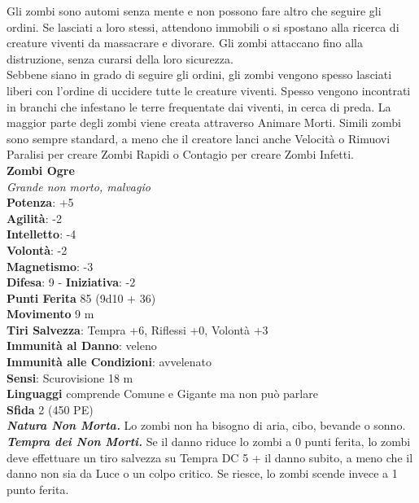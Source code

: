 \begin{multicols}{2}
Gli zombi sono automi senza mente e non possono fare altro che seguire gli ordini. Se lasciati a loro stessi, attendono immobili o si spostano alla ricerca di creature viventi da massacrare e divorare. Gli zombi attaccano fino alla distruzione, senza curarsi della loro sicurezza.\\

Sebbene siano in grado di seguire gli ordini, gli zombi vengono spesso lasciati liberi con l’ordine di uccidere tutte le creature viventi. Spesso vengono incontrati in branchi che infestano le terre frequentate dai viventi, in cerca di preda. La maggior parte degli zombi viene creata attraverso Animare Morti. Simili zombi sono sempre standard, a meno che il creatore lanci anche Velocità o Rimuovi Paralisi per creare Zombi Rapidi o Contagio per creare Zombi Infetti.\\

\medskip\textbf{Zombi Ogre}\\
\emph{Grande non morto, malvagio}\\
\textbf{Potenza}: +5\\
\textbf{Agilità}: -2\\
\textbf{Intelletto}: -4\\
\textbf{Volontà}: -2\\
\textbf{Magnetismo}: -3\\
\textbf{Difesa}: 9 - \textbf{Iniziativa}: -2\\
\textbf{Punti Ferita} 85 (9d10 + 36)\\
\textbf{Movimento} 9 m\\
\textbf{Tiri Salvezza}: Tempra +6, Riflessi +0, Volontà +3\\
\textbf{Immunità al Danno}: veleno\\
\textbf{Immunità alle Condizioni}: avvelenato\\
\textbf{Sensi}: Scurovisione 18 m\\
\textbf{Linguaggi} comprende Comune e Gigante ma non può parlare\\
\textbf{Sfida} 2 (450 PE)\smallskip\\
\emph{\textbf{Natura Non Morta.}} Lo zombi non ha bisogno di aria, cibo, bevande o sonno.\\
\emph{\textbf{Tempra dei Non Morti.}} Se il danno riduce lo zombi a 0 punti ferita, lo zombi deve effettuare un tiro salvezza su Tempra DC 5 + il danno subito, a meno che il danno non sia da Luce o un colpo critico. Se riesce, lo zombi scende invece a 1 punto ferita.\\


\end{multicols}
